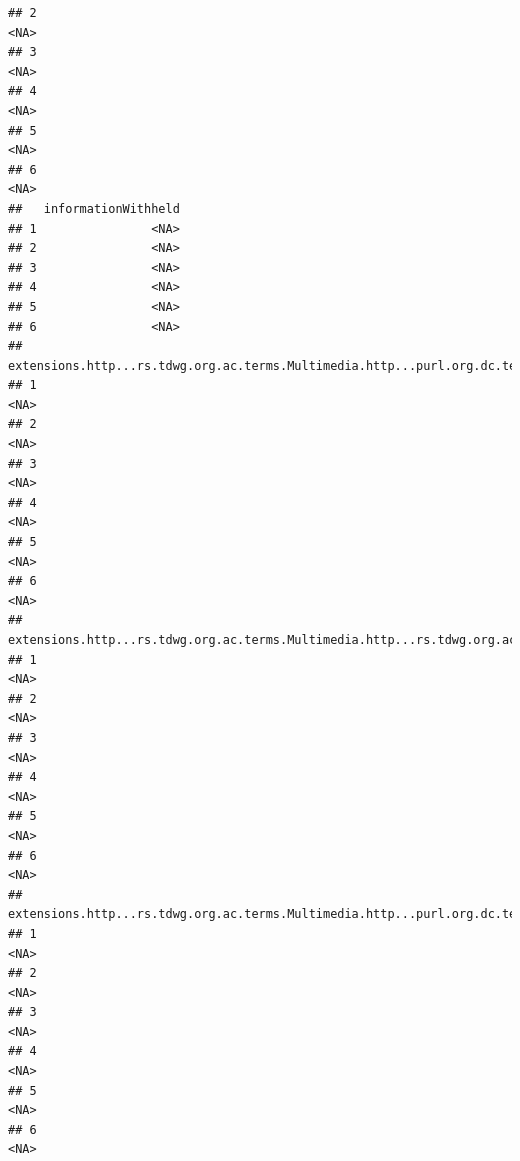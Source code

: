 \documentclass[
]{book}
\begin{document}
\begin{verbatim}
## 2                                                                                <NA>
## 3                                                                                <NA>
## 4                                                                                <NA>
## 5                                                                                <NA>
## 6                                                                                <NA>
##   informationWithheld
## 1                <NA>
## 2                <NA>
## 3                <NA>
## 4                <NA>
## 5                <NA>
## 6                <NA>
##   extensions.http...rs.tdwg.org.ac.terms.Multimedia.http...purl.org.dc.terms.identifier.2
## 1                                                                                    <NA>
## 2                                                                                    <NA>
## 3                                                                                    <NA>
## 4                                                                                    <NA>
## 5                                                                                    <NA>
## 6                                                                                    <NA>
##   extensions.http...rs.tdwg.org.ac.terms.Multimedia.http...rs.tdwg.org.ac.terms.taxonCoverage.2
## 1                                                                                          <NA>
## 2                                                                                          <NA>
## 3                                                                                          <NA>
## 4                                                                                          <NA>
## 5                                                                                          <NA>
## 6                                                                                          <NA>
##   extensions.http...rs.tdwg.org.ac.terms.Multimedia.http...purl.org.dc.terms.modified.2
## 1                                                                                  <NA>
## 2                                                                                  <NA>
## 3                                                                                  <NA>
## 4                                                                                  <NA>
## 5                                                                                  <NA>
## 6                                                                                  <NA>

\end{verbatim}
\end{document}
